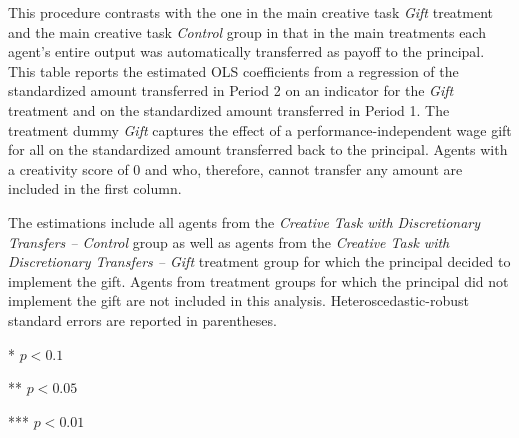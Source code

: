 \begin{table}[h]
\begin{center}
\begin{minipage}{\textwidth}
This procedure contrasts with the one in the main creative task \textit{Gift} treatment and the main creative task \textit{Control} group in that in the main treatments each agent's entire output was automatically transferred as payoff to the principal. 
This table reports the estimated OLS coefficients from a regression of the standardized amount transferred in Period 2 on an indicator for the \textit{Gift} treatment and on the standardized amount transferred in Period 1. 
The treatment dummy \textit{Gift} captures the effect of a performance-independent wage gift for all on the standardized amount transferred back to the principal. 
Agents with a creativity score of 0 and who, therefore, cannot transfer any amount are included in the first column. 

The estimations include all agents from the \textit{Creative Task with Discretionary Transfers -- Control} group as well as agents from the \textit{Creative Task with Discretionary Transfers -- Gift} treatment group for which the principal decided to implement the gift. Agents from treatment groups for which the principal did not implement the gift are not included in this analysis. 
Heteroscedastic-robust standard errors are reported in parentheses. 

*   $ p < 0.1  $

**  $ p < 0.05 $

*** $ p < 0.01 $
\end{minipage}
\end{center}
\end{table}
